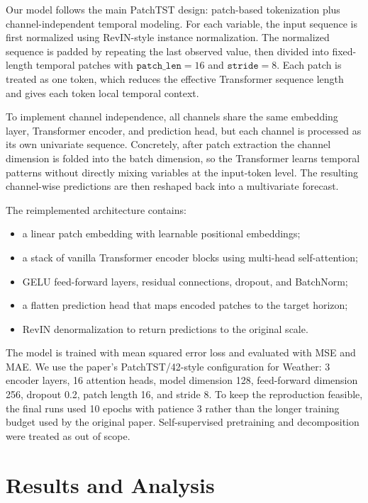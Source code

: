 \documentclass[11pt]{article}
\begin{document}
Our model follows the main PatchTST design: patch-based tokenization plus channel-independent temporal modeling. For each variable, the input sequence is first normalized using RevIN-style instance normalization. The normalized sequence is padded by repeating the last observed value, then divided into fixed-length temporal patches with \(\texttt{patch\_len}=16\) and \(\texttt{stride}=8\). Each patch is treated as one token, which reduces the effective Transformer sequence length and gives each token local temporal context.

To implement channel independence, all channels share the same embedding layer, Transformer encoder, and prediction head, but each channel is processed as its own univariate sequence. Concretely, after patch extraction the channel dimension is folded into the batch dimension, so the Transformer learns temporal patterns without directly mixing variables at the input-token level. The resulting channel-wise predictions are then reshaped back into a multivariate forecast.

The reimplemented architecture contains:

\begin{itemize}
    \item a linear patch embedding with learnable positional embeddings;
    \item a stack of vanilla Transformer encoder blocks using multi-head self-attention;
    \item GELU feed-forward layers, residual connections, dropout, and BatchNorm;
    \item a flatten prediction head that maps encoded patches to the target horizon;
    \item RevIN denormalization to return predictions to the original scale.
\end{itemize}

The model is trained with mean squared error loss and evaluated with MSE and MAE. We use the paper's PatchTST/42-style configuration for Weather: 3 encoder layers, 16 attention heads, model dimension 128, feed-forward dimension 256, dropout 0.2, patch length 16, and stride 8. To keep the reproduction feasible, the final runs used 10 epochs with patience 3 rather than the longer training budget used by the original paper. Self-supervised pretraining and decomposition were treated as out of scope.

\section{Results and Analysis}
\end{document}
